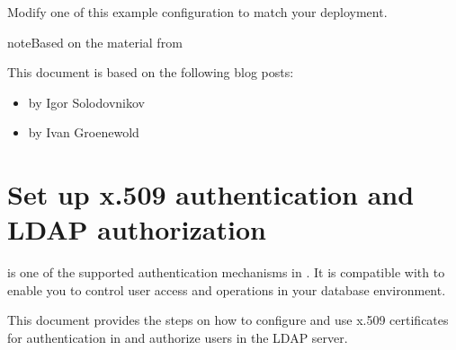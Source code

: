 \documentclass[letterpaper,10pt,english]{sphinxmanual}
\begin{document}
\sphinxAtStartPar
Modify one of this example configuration to match your deployment.

\begin{sphinxadmonition}{note}{Based on the material from }

\sphinxAtStartPar
This document is based on the following blog posts:
\begin{itemize}
\item {} 
\sphinxAtStartPar
{} by Igor Solodovnikov

\item {} 
\sphinxAtStartPar
{} by Ivan Groenewold

\end{itemize}
\end{sphinxadmonition}


\chapter{Set up x.509 authentication and LDAP authorization}
\label{\detokenize{x509-ldap:set-up-x-509-authentication-and-ldap-authorization}}\label{\detokenize{x509-ldap:ldap-x509}}\label{\detokenize{x509-ldap::doc}}
\sphinxAtStartPar
{\hyperref[\detokenize{authentication:x509}]{}} is one of the supported authentication mechanisms in . It is compatible with {\hyperref[\detokenize{authorization:ldap-authorization}]{}} to enable you to control user access and operations in your database environment.

\sphinxAtStartPar
This document provides the steps on how to configure and use x.509 certificates for authentication in  and authorize users in the LDAP server.
\end{document}
